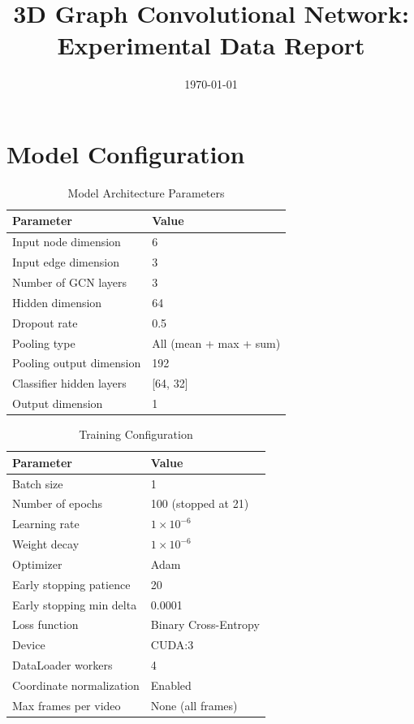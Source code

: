 \documentclass[11pt,a4paper]{article}
\title{\textbf{3D Graph Convolutional Network: Experimental Data Report}}
\author{}
\date{\today}
\begin{document}
\maketitle

\section{Model Configuration}

\begin{table}[H]
\centering
\caption{Model Architecture Parameters}
\begin{tabular}{ll}
\toprule
\textbf{Parameter} & \textbf{Value} \\
\midrule
Input node dimension & 6 \\
Input edge dimension & 3 \\
Number of GCN layers & 3 \\
Hidden dimension & 64 \\
Dropout rate & 0.5 \\
Pooling type & All (mean + max + sum) \\
Pooling output dimension & 192 \\
Classifier hidden layers & [64, 32] \\
Output dimension & 1 \\
\bottomrule
\end{tabular}
\end{table}

\begin{table}[H]
\centering
\caption{Training Configuration}
\begin{tabular}{ll}
\toprule
\textbf{Parameter} & \textbf{Value} \\
\midrule
Batch size & 1 \\
Number of epochs & 100 (stopped at 21) \\
Learning rate & $1 \times 10^{-6}$ \\
Weight decay & $1 \times 10^{-6}$ \\
Optimizer & Adam \\
Early stopping patience & 20 \\
Early stopping min delta & 0.0001 \\
Loss function & Binary Cross-Entropy \\
Device & CUDA:3 \\
DataLoader workers & 4 \\
Coordinate normalization & Enabled \\
Max frames per video & None (all frames) \\
\bottomrule
\end{tabular}
\end{table}
\end{document}
